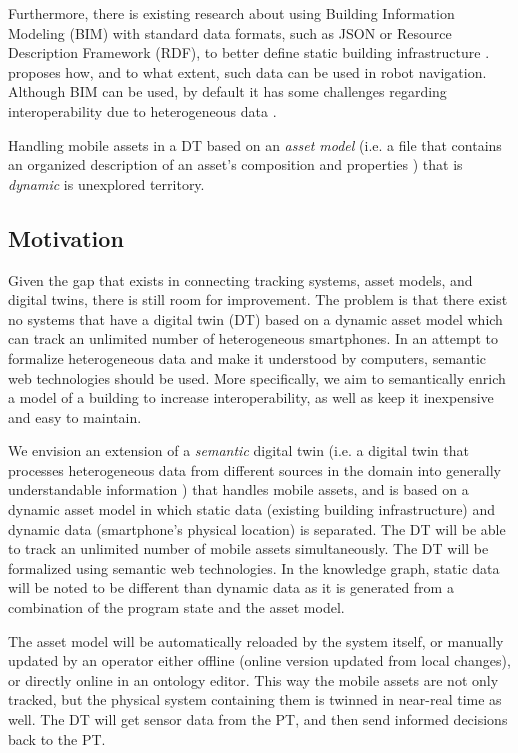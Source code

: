 \documentclass{article}
\begin{document}
Furthermore, there is existing research about using Building Information Modeling (BIM) with standard data formats, such as JSON or Resource Description Framework (RDF), to better define static building infrastructure \cite{pauwels_live_2023}. \citeauthor{pauwels_live_2023} proposes how, and to what extent, such data can be used in robot navigation. Although BIM can be used, by default it has some challenges regarding interoperability due to heterogeneous data \cite{dinis_bim_2022,godager_concept_2021}.

Handling mobile assets in a DT based on an \emph{asset model} (i.e. a file that contains an organized description of an asset's composition and properties \cite{kamburjan_twinning-by-construction_2022}) that is \emph{dynamic} is unexplored territory.

\subsection{Motivation}\label{subsec:Motivation}
Given the gap that exists in connecting tracking systems, asset models, and digital twins, there is still room for improvement. The problem is that there exist no systems that have a digital twin (DT) based on a dynamic asset model which can track an unlimited number of heterogeneous smartphones. In an attempt to formalize heterogeneous data and make it understood by computers, semantic web technologies should be used. More specifically, we aim to semantically enrich a model of a building to increase interoperability, as well as keep it inexpensive and easy to maintain.

We envision an extension of a \emph{semantic} digital twin (i.e. a digital twin that processes heterogeneous data from different sources in the domain into generally understandable information \cite{birgit_boss_digital_nodate}) that handles mobile assets, and is based on a dynamic asset model in which static data (existing building infrastructure) and dynamic data (smartphone's physical location) is separated. The DT will be able to track an unlimited number of mobile assets simultaneously. The DT will be formalized using semantic web technologies. In the knowledge graph, static data will be noted to be different than dynamic data as it is generated from a combination of the program state and the asset model. 

The asset model will be automatically reloaded by the system itself, or manually updated by an operator either offline (online version updated from local changes), or directly online in an ontology editor. This way the mobile assets are not only tracked, but the physical system containing them is twinned in near-real time as well. The DT will get sensor data from the PT, and then send informed decisions back to the PT.
\end{document}
